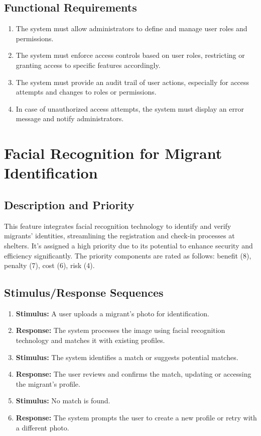 \documentclass{scrreprt}
\begin{document}
\subsection{Functional Requirements}
\begin{enumerate}[resume*=func-req, leftmargin=60pt]
    \item The system must allow administrators to define and manage user roles and permissions.
    \item The system must enforce access controls based on user roles, restricting or granting access to specific features accordingly.
    \item The system must provide an audit trail of user actions, especially for access attempts and changes to roles or permissions.
    \item In case of unauthorized access attempts, the system must display an error message and notify administrators.
\end{enumerate}

\section{Facial Recognition for Migrant Identification}
\subsection{Description and Priority}
This feature integrates facial recognition technology to identify and verify migrants' identities, streamlining the registration and check-in processes at shelters. It's assigned a high priority due to its potential to enhance security and efficiency significantly. The priority components are rated as follows: benefit (8), penalty (7), cost (6), risk (4).
\subsection{Stimulus/Response Sequences}
\begin{enumerate}
    \item \textbf{Stimulus:} A user uploads a migrant's photo for identification.
    \item \textbf{Response:} The system processes the image using facial recognition technology and matches it with existing profiles.
    \item \textbf{Stimulus:} The system identifies a match or suggests potential matches.
    \item \textbf{Response:} The user reviews and confirms the match, updating or accessing the migrant's profile.
    \item \textbf{Stimulus:} No match is found.
    \item \textbf{Response:} The system prompts the user to create a new profile or retry with a different photo.
\end{enumerate}
\end{document}
